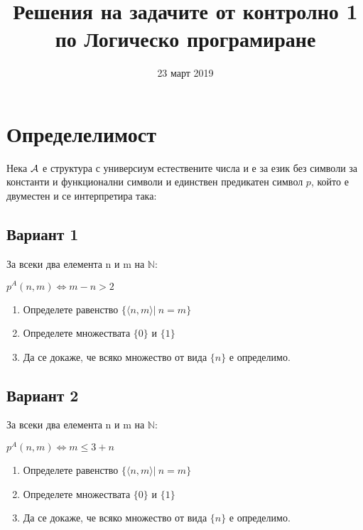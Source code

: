 \documentclass{article}
\title{Решения на задачите от контролно 1 по Логическо програмиране}
\date{23 март 2019}
\begin{document}
\maketitle

\section{Определелимост}
Нека ${\cal A}$ е структура с универсиум естествените числа и е за език без символи за константи и функционални
символи и единствен предикатен символ $p$, който е двуместен и се интерпретира така:
\subsection{Вариант 1}
За всеки два елемента n и m на $\mathbb{N}$:
\begin{center}
$p^A(n, m) \iff m-n>2$
\end{center}

\begin{enumerate}[label=(\roman*)]
\item Определете равенство $\{\langle n,m \rangle |\ n=m\}$
\item Определете множествата $\{0\}$ и $\{1\}$
\item Да се докаже, че всяко множество от вида $\{n\}$ е определимо.
\end{enumerate}

\subsection{Вариант 2}
За всеки два елемента n и m на $\mathbb{N}$:
\begin{center}
$p^A(n, m) \iff m \leq 3 + n$
\end{center}

\begin{enumerate}[label=(\roman*)]
\item Определете равенство $\{\langle n,m \rangle |\ n=m\}$
\item Определете множествата $\{0\}$ и $\{1\}$
\item Да се докаже, че всяко множество от вида $\{n\}$ е определимо.
\end{enumerate}

\newpage
\end{document}
